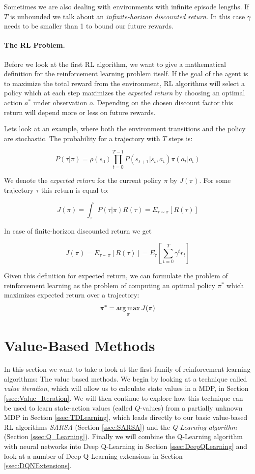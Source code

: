 Sometimes we are also dealing with environments with infinite episode lengths. If $T$ is unbounded we talk about an \textit{infinite-horizon discounted return}. In this case $\gamma$ needs to be smaller than 1 to bound our future rewards.

\paragraph{The RL Problem.}
Before we look at the first RL algorithm, we want to give a mathematical definition for the reinforcement learning problem itself. If the goal of the agent is to maximize the total reward from the environment, RL algorithms will select a policy which at each step maximizes the \textit{expected return} by choosing an optimal action $a^*$ under observation $o$. Depending on the chosen discount factor this return will depend more or less on future rewards.

Lets look at an example, where both the environment transitions and the policy are stochastic. The probability for a trajectory with $T$ steps is: 

\[P(\tau|\pi)=\rho(s_0)\prod_{t=0}^{T-1}P(s_{t+1}|s_t, a_t)\pi(a_t|o_t)\]

We denote the \textit{expected return} for the current policy $\pi$ by $J(\pi)$. For some trajectory $\tau$ this return is equal to:

\[J(\pi) = \int_\tau P(\tau|\pi)R(\tau) = E_{\tau\sim\pi}\left[R(\tau) \right]\]

In case of finite-horizon discounted return we get 

\[J(\pi) =  E_{\tau\sim\pi}\left[R(\tau) \right] = E_\tau\left[\sum_{t=0}^T \gamma^t r_t\right]\]

Given this definition for expected return, we can formulate the problem of reinforcement learning as the problem of computing an optimal policy $\pi^*$ which maximizes expected return over a trajectory:
\[\pi^*=\operatorname*{arg\,max}_\pi J(\pi)\]

\section{Value-Based Methods} \label{sec:ValueMethods}
In this section we want to take a look at the first family of reinforcement learning algorithms: The value based methods. We begin by looking at a technique called \textit{value iteration}, which will allow us to calculate state values in a MDP, in Section \ref{ssec:Value_Iteration}. We will then continue to explore how this technique can be used to learn state-action values (called $Q$-values) from a partially unknown MDP in Section \ref{ssec:TDLearning}, which leads directly to our basic value-based RL algorithms \textit{SARSA} (Section \ref{ssec:SARSA}) and the \textit{Q-Learning algorithm} (Section \ref{ssec:Q_Learning}). Finally we will combine the Q-Learning algorithm with neural networks into Deep Q-Learning in Section \ref{ssec:DeepQLearning} and look at a number of Deep Q-Learning extensions in Section \ref{ssec:DQNExtensions}. 

